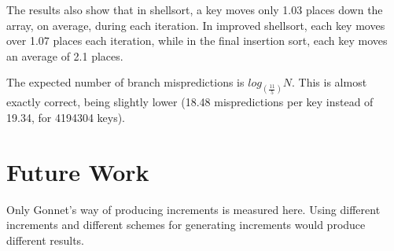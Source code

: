 The results also show that in shellsort, a key moves only 1.03 places down the
array, on average, during each iteration. In improved shellsort, each key moves
over 1.07 places each iteration, while in the final insertion sort, each key
moves an average of 2.1 places.

The expected number of branch mispredictions is $log_{(\frac{11}{5})}N$. This
is almost exactly correct, being slightly lower (18.48 mispredictions per key
instead of 19.34, for 4194304 keys).


\section{Future Work}
Only Gonnet's way of producing increments is measured here. Using different
increments and different schemes for generating increments would produce
different results. 
